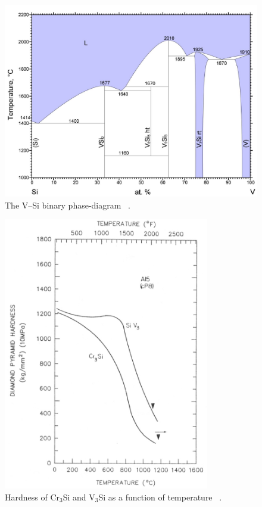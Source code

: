 %
\begin{figure}[H]
\begin{center}
\includegraphics[width=12cm]{VSi}
\caption{The V--Si binary phase-diagram ~\cite{smith90}.}
\label{fig:VSi}
\end{center}
\end{figure}
%

%
\begin{figure}[H]
\begin{center}
\includegraphics[width=9cm]{VCr3Si_hardness}
\vspace{-2mm}
\caption{Hardness of Cr$_3$Si and V$_3$Si as a function of temperature ~\cite{shah92}.}\label{fig:VCr_hardness}
\end{center}
\end{figure}
\vspace{-1cm}
%



